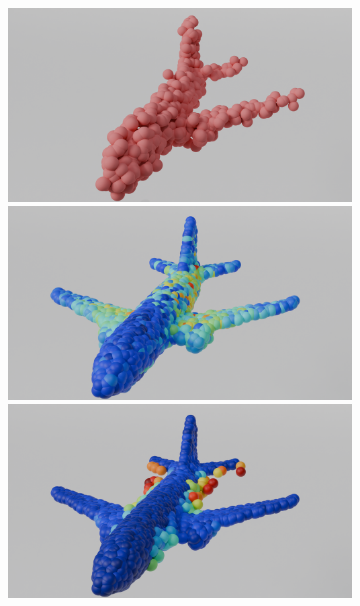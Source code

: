         \begin{figure}[htb]
          \centering
          \begin{subfigure}[t]{\textwidth+20pt\relax}
            \includegraphics[width=\dimexpr\linewidth-20pt\relax]{figures/part_ap1.png}
            \includegraphics[width=\dimexpr\linewidth-20pt\relax]{figures/iml_ind_ap1.png}
            \includegraphics[width=\dimexpr\linewidth-20pt\relax]{figures/iml_lin_ap1.png}

\end{subfigure}
\end{figure}
